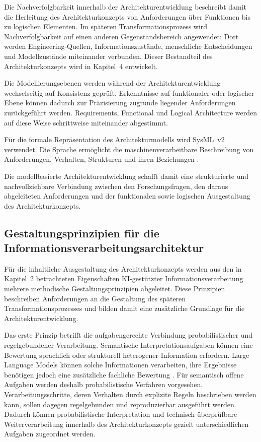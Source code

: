 Die Nachverfolgbarkeit innerhalb der Architekturentwicklung beschreibt damit
die Herleitung des Architekturkonzepts von Anforderungen über Funktionen bis
zu logischen Elementen. Im späteren Transformationsprozess wird
Nachverfolgbarkeit auf einen anderen Gegenstandsbereich angewendet: Dort
werden Engineering-Quellen, Informationszustände, menschliche Entscheidungen
und Modellzustände miteinander verbunden. Dieser Bestandteil des
Architekturkonzepts wird in Kapitel~4 entwickelt.

Die Modellierungsebenen werden während der Architekturentwicklung
wechselseitig auf Konsistenz geprüft. Erkenntnisse auf funktionaler oder
logischer Ebene können dadurch zur Präzisierung zugrunde liegender
Anforderungen zurückgeführt werden. Requirements, Functional und Logical
Architecture werden auf diese Weise schrittweise miteinander abgestimmt.

Für die formale Repräsentation des Architekturmodells wird SysML~v2
verwendet. Die Sprache ermöglicht die maschinenverarbeitbare Beschreibung von
Anforderungen, Verhalten, Strukturen und ihren Beziehungen
\cite{SysMLv2}.

Die modellbasierte Architekturentwicklung schafft damit eine strukturierte und
nachvollziehbare Verbindung zwischen den Forschungsfragen, den daraus
abgeleiteten Anforderungen und der funktionalen sowie logischen Ausgestaltung
des Architekturkonzepts.

\subsection{Gestaltungsprinzipien für die Informationsverarbeitungsarchitektur}
\label{sec:ki_gestaltungsprinzipien}

Für die inhaltliche Ausgestaltung des Architekturkonzepts werden aus den in
Kapitel~2 betrachteten Eigenschaften KI-gestützter Informationsverarbeitung
mehrere methodische Gestaltungsprinzipien abgeleitet. Diese Prinzipien
beschreiben Anforderungen an die Gestaltung des späteren
Transformationsprozesses und bilden damit eine zusätzliche Grundlage für die
Architekturentwicklung.

Das erste Prinzip betrifft die aufgabengerechte Verbindung probabilistischer
und regelgebundener Verarbeitung. Semantische Interpretationsaufgaben können
eine Bewertung sprachlich oder strukturell heterogener Information erfordern.
Large Language Models können solche Informationen verarbeiten, ihre Ergebnisse
benötigen jedoch eine zusätzliche fachliche Bewertung
\cite{Souza.2026,Topcu2025}. Für semantisch offene Aufgaben werden deshalb
probabilistische Verfahren vorgesehen. Verarbeitungsschritte, deren Verhalten
durch explizite Regeln beschrieben werden kann, sollen dagegen regelgebunden
und reproduzierbar ausgeführt werden. Dadurch können probabilistische
Interpretation und technisch überprüfbare Weiterverarbeitung innerhalb des
Architekturkonzepts gezielt unterschiedlichen Aufgaben zugeordnet werden.


